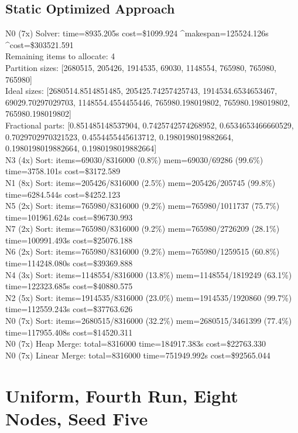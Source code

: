 \documentclass[]{interact}
\theoremstyle{plain}
\theoremstyle{definition}
\theoremstyle{remark}
\begin{document}
\subsection{Static Optimized Approach}
N0 (7x) Solver: time=8935.205\textmu s cost=\$1099.924 \^{}makespan=125524.126\textmu s \^{}cost=\$303521.591\\
Remaining items to allocate: 4\\
Partition sizes: [2680515, 205426, 1914535, 69030, 1148554, 765980, 765980, 765980]\\
Ideal sizes: [2680514.8514851485, 205425.74257425743, 1914534.6534653467, 69029.70297029703, 1148554.4554455446, 765980.198019802, 765980.198019802, 765980.198019802]\\
Fractional parts: [0.851485148537904, 0.7425742574268952, 0.6534653466660529, 0.7029702970321523, 0.4554455445613712, 0.1980198019882664, 0.1980198019882664, 0.1980198019882664]\\
N3 (4x) Sort: items=69030/8316000 (0.8\%) mem=69030/69286 (99.6\%) time=3758.101\textmu s cost=\$3172.589\\
N1 (8x) Sort: items=205426/8316000 (2.5\%) mem=205426/205745 (99.8\%) time=6284.544\textmu s cost=\$4252.123\\
N5 (2x) Sort: items=765980/8316000 (9.2\%) mem=765980/1011737 (75.7\%) time=101961.624\textmu s cost=\$96730.993\\
N7 (2x) Sort: items=765980/8316000 (9.2\%) mem=765980/2726209 (28.1\%) time=100991.493\textmu s cost=\$25076.188\\
N6 (2x) Sort: items=765980/8316000 (9.2\%) mem=765980/1259515 (60.8\%) time=114248.080\textmu s cost=\$39369.888\\
N4 (3x) Sort: items=1148554/8316000 (13.8\%) mem=1148554/1819249 (63.1\%) time=122323.685\textmu s cost=\$40880.575\\
N2 (5x) Sort: items=1914535/8316000 (23.0\%) mem=1914535/1920860 (99.7\%) time=112559.243\textmu s cost=\$37763.626\\
N0 (7x) Sort: items=2680515/8316000 (32.2\%) mem=2680515/3461399 (77.4\%) time=117955.408\textmu s cost=\$14520.311\\
N0 (7x) Heap Merge: total=8316000 time=184917.383\textmu s cost=\$22763.330\\
N0 (7x) Linear Merge: total=8316000 time=751949.992\textmu s cost=\$92565.044

\clearpage

\section{Uniform, Fourth Run, Eight Nodes, Seed Five}
\end{document}

